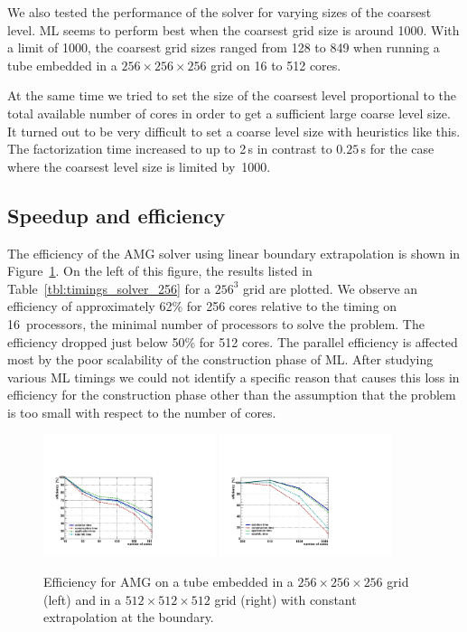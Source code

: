 \documentclass[a4paper,10pt,3p,preprint,pdftex]{elsarticle}
\begin{document}
We also tested the performance of the solver for varying sizes of the
coarsest level.  ML seems to perform best when the coarsest grid size is
around 1000.  With a limit of 1000, the coarsest grid sizes ranged from
128 to 849 when running a tube embedded in a $256 \times 256 \times 256$
grid on 16 to 512 cores.

At the same time we tried to set the size of the coarsest level
proportional to the total available number of cores in order to get a
sufficient large coarse level size.  It turned out to be very difficult
to set a coarse level size with heuristics like this.  The factorization
time increased to up to 2\,s in contrast to $0.25$\,s for the case where
the coarsest level size is limited by~1000.


\subsection{Speedup and efficiency}

The efficiency of the AMG solver using linear boundary extrapolation is
shown in Figure~\ref{fig:speedup}.  On the left of this figure, the
results listed in Table~\ref{tbl:timings_solver_256} for a $256^3$ grid are
plotted.  We observe an efficiency of approximately 62\% for 256 cores
relative to the timing on 16~processors, the minimal number of
processors to solve the problem.  The efficiency dropped just below 50\%
for 512 cores.  The parallel efficiency is affected most by the poor
scalability of the construction phase of ML.  After studying various ML
timings we could not identify a specific reason that causes this loss in
efficiency for the construction phase other than the assumption that the
problem is too small with respect to the number of cores.

\begin{figure}[htb] 
  \begin{center}
    \includegraphics[width=0.45\textwidth]{eff_256.pdf}
    \includegraphics[width=0.45\textwidth]{eff_512.pdf}
    \caption{Efficiency for AMG on a tube embedded in a
      $256\times256\times256$ grid (left) and in a
      $512\times512\times512$ grid (right) with constant extrapolation
      at the boundary.}
    \label{fig:speedup}
  \end{center} 
\end{figure}
\end{document}
